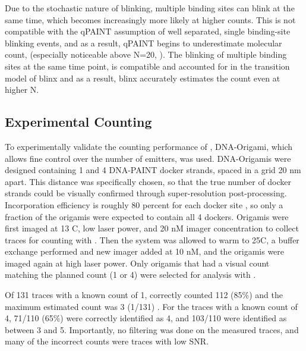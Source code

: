 Due to the stochastic nature of blinking, multiple binding sites can blink at the same time, which becomes increasingly more likely at higher counts.
	This is not compatible with the qPAINT assumption of well separated, single binding-site blinking events, 
	and as a result, qPAINT begins to underestimate molecular count, (especially noticeable above N=20, ). 
	The blinking of multiple binding sites at the same time point, 
	is compatible and accounted for in the transition model of blinx 
	and as a result, blinx accurately estimates the count even at higher N.
	

\subsection{Experimental Counting}
To experimentally validate the counting performance of \ours, DNA-Origami, which allows fine control over the number of emitters, was used.
	DNA-Origamis were designed containing 1 and 4 DNA-PAINT docker strands, spaced in a grid 20 nm apart. 
	This distance was specifically chosen, so that the true number of docker strands could be visually confirmed through super-resolution post-processing.
	Incorporation efficiency is roughly 80 percent for each docker site \cite{strauss_2018}, so only a fraction of the origamis were expected to contain all 4 dockers. 
	Origamis were first imaged at 13 C, low laser power, and 20 nM imager concentration to collect traces for counting with \ours {}.
	Then the system was allowed to warm to 25C, a buffer exchange performed and new imager added at 10 nM, and the origamis were imaged again at high laser power.
	Only origamis that had a visual count matching the planned count (1 or 4) were selected for analysis with \ours.

Of 131 traces with a known count of 1, \ours correctly counted 112 (85\%) and the maximum estimated count was 3 (1/131) \figref{}.
	For the traces with a known count of 4, 71/110 (65\%) were correctly identified as 4, and 103/110 were identified as between 3 and 5.
	Importantly, no filtering was done on the measured traces, and many of the incorrect counts were traces with low SNR. %
